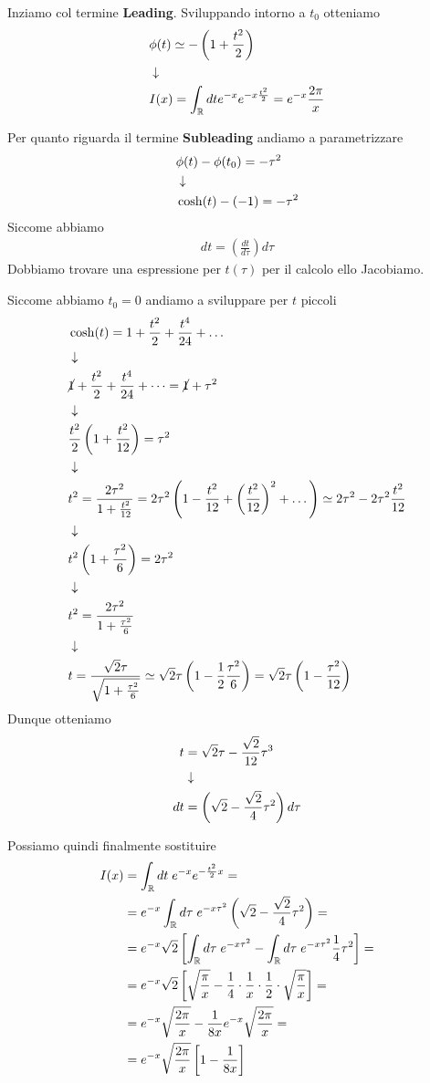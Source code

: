 Inziamo col termine \textbf{Leading}. Sviluppando intorno a $t_0$ otteniamo
\begin{align}
	&\phi(t) \simeq -\left( 1 + \frac{t^2}{2} \right)\\ &\downarrow \nonumber \\
	&I(x) = \int_{\mathbb{R}} dt e^{-x}e^{-x \frac{t^2}{2}} = e^{-x} \frac{2\pi}{x}	
\end{align}

Per quanto riguarda il termine \textbf{Subleading} andiamo a parametrizzare
\begin{align}
	&\phi(t) - \phi(t_0) = -\tau^2 \\ &\downarrow \nonumber \\
	& \cosh(t) -(-1) = -\tau^2
\end{align}
Siccome abbiamo
\begin{align}
	dt = \left( \frac{dt}{d\tau} \right) d\tau
\end{align}
Dobbiamo trovare una espressione per $t(\tau)$ per il calcolo ello Jacobiamo.

Siccome abbiamo $t_0 = 0$ andiamo a sviluppare per $t$ piccoli
\begin{align}
	&\cosh(t) = 1 + \frac{t^2}{2} + \frac{t^4}{24} + \dots \\ &\downarrow \nonumber \\
	&\cancel{1} + \frac{t^2}{2} + \frac{t^4}{24} + \dots = \cancel{1} + \tau^2 \nonumber \\ &\downarrow \nonumber \\
	&\frac{t^2}{2} \left( 1 + \frac{t^2}{12} \right) = \tau^2 \\ &\downarrow \nonumber \\
	&t^2 = \frac{2\tau^2}{1 + \frac{t^2}{12}} = 2\tau^2 \left( 1 - \frac{t^2}{12} + \left( \frac{t^2}{12} \right)^2 + \dots \right) \simeq 2\tau^2 - 2\tau^2 \frac{t^2}{12} \\ &\downarrow \nonumber \\
	&t^2 \left( 1 + \frac{\tau^2}{6} \right) = 2\tau^2 \nonumber \\ &\downarrow \nonumber \\
	&t^2=\frac{2\tau^2}{1 + \frac{\tau^2}{6}}\nonumber \\ &\downarrow \nonumber \\
	&t=\frac{\sqrt{2}\tau}{\sqrt{1 + \frac{\tau^2}{6}}} \simeq \sqrt{2}\tau \left( 1 - \frac{1}{2} \frac{\tau^2}{6} \right) = \sqrt{2}\tau \left( 1 - \frac{\tau^2}{12} \right)
\end{align}
Dunque otteniamo
\begin{align}
	t &= \sqrt{2} \tau - \frac{\sqrt{2}}{12}\tau^3 \\ &\downarrow \nonumber \\
	dt &= \left( \sqrt{2} - \frac{\sqrt{2}}{4}\tau^2 \right)d\tau 
\end{align}

Possiamo quindi finalmente sostituire
\begin{align}
	I(x) &= \int_{\mathbb{R}} dt \; e^{-x} e^{-\frac{t^2}{2} x} = \nonumber \\
		 &= e^{-x} \int_{\mathbb{R}} d\tau \; e^{-x\tau^2}  \left( \sqrt{2} - \frac{\sqrt{2}}{4}\tau^2 \right) = \nonumber \\
		 &= e^{-x}\sqrt{2} \left[ \int_{\mathbb{R}} d\tau \; e^{-x\tau^2}   -\int_{\mathbb{R}} d\tau \;e^{-x\tau^2}  \frac{1}{4}\tau^2  \right]= \nonumber \\
		 &= e^{-x}\sqrt{2} \left[ \sqrt{\frac{\pi}{x}}   - \frac{1}{4}\cdot\frac{1}{x} \cdot \frac{1}{2} \cdot \sqrt{\frac{\pi}{x}}  \right]= \nonumber \\
		 &=e^{-x}\sqrt{\frac{2\pi}{x}} - \frac{1}{8x}e^{-x}\sqrt{\frac{2\pi}{x}}= \nonumber \\
		 &=e^{-x}\sqrt{\frac{2\pi}{x}}\left[1 - \frac{1}{8x}\right]
\end{align}

